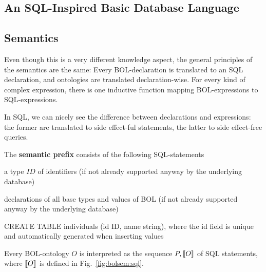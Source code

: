 \subsection{An SQL-Inspired Basic Database Language}\label{sec:wuv:bdl}
  

\subsection{Semantics}

Even though this is a very different knowledge aspect, the general principles of the semantics are the same:
Every BOL-declaration is translated to an SQL declaration, and ontologies are translated declaration-wise.
For every kind of complex expression, there is one inductive function mapping BOL-expressions to SQL-expressions.

In SQL, we can nicely see the difference between declarations and expressions: the former are translated to side effect-ful statements, the latter to side effect-free queries.

\begin{definition}\label{def:bolsem:sql}
The \textbf{semantic prefix} consists of the following SQL-statements
\begin{compactitem}
 \item a type $ID$ of identifiers (if not already supported anyway by the underlying database)
 \item declarations of all base types and values of BOL (if not already supported anyway by the underlying database)
 \item CREATE TABLE individuals (id ID, name string), where the id field is unique and automatically generated when inserting values
\end{compactitem}

Every BOL-ontology $O$ is interpreted as the sequence $P,\llbracket O\rrbracket$ of SQL statements, where $\llbracket O\rrbracket$ is defined in Fig.~\ref{fig:bolsem:sql}.
\end{definition}

